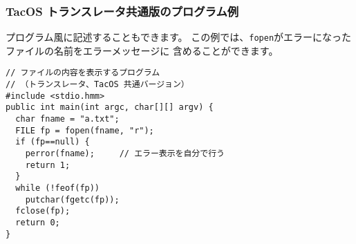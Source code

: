 \subsubsection{TacOS トランスレータ共通版のプログラム例}

\cl プログラム風に記述することもできます。
この例では、\verb/fopen/がエラーになったファイルの名前をエラーメッセージに
含めることができます。

\begin{mylist}
\begin{verbatim}
// ファイルの内容を表示するプログラム
// （トランスレータ、TacOS 共通バージョン）
#include <stdio.hmm>
public int main(int argc, char[][] argv) {
  char fname = "a.txt";
  FILE fp = fopen(fname, "r");
  if (fp==null) {
    perror(fname);     // エラー表示を自分で行う
    return 1;
  }
  while (!feof(fp))
    putchar(fgetc(fp));
  fclose(fp);
  return 0;
}
\end{verbatim}
\end{mylist}

